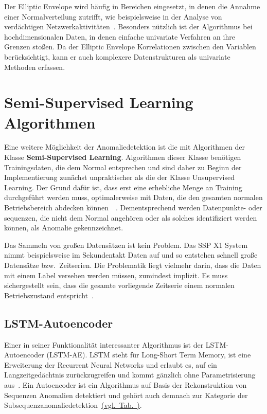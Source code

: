 Der Elliptic Envelope wird häufig in Bereichen eingesetzt, in denen die Annahme einer Normalverteilung zutrifft, wie beispielsweise in der Analyse von
verdächtigen Netzwerkaktivitäten~\cite{Ashrafuzzaman2020}. Besonders nützlich ist der Algorithmus bei hochdimensionalen Daten, in denen
einfache univariate Verfahren an ihre Grenzen stoßen. Da der Elliptic Envelope Korrelationen zwischen den Variablen berücksichtigt, kann er auch komplexere
Datenstrukturen als univariate Methoden erfassen.

\section{Semi-Supervised Learning Algorithmen}
Eine weitere Möglichkeit der Anomaliedetektion ist die mit Algorithmen der Klasse \textbf{Semi-Supervised Learning}. Algorithmen dieser Klasse benötigen
Trainingsdaten, die dem Normal entsprechen und sind daher zu Beginn der Implementierung zunächst unpraktischer als die der Klasse Unsupervised Learning.
Der Grund dafür ist, dass erst eine erhebliche Menge an Training durchgeführt werden muss, optimalerweise mit Daten, die den gesamten normalen Betriebsbereich
abdecken können~\cite[S.~2-4]{Chapelle2010}~\cite{Schmidl2022}. Dementsprechend werden Datenpunkte- oder sequenzen, die nicht dem Normal angehören oder
als solches identifiziert werden können, als Anomalie gekennzeichnet.

Das Sammeln von großen Datensätzen ist kein Problem. Das SSP X1 System nimmt beispielsweise im Sekundentakt Daten auf und so entstehen schnell große
Datensätze bzw.~Zeitserien. Die Problematik liegt vielmehr darin, dass die Daten mit einem Label versehen werden müssen, zumindest implizit. Es muss
sichergestellt sein, dass die gesamte vorliegende Zeitserie einem normalen Betriebszustand entspricht~\cite[S.~10~ff]{Chapelle2010}.

\subsection{LSTM-Autoencoder}
Einer in seiner Funktionalität interessanter Algorithmus ist der LSTM-Autoencoder (LSTM-AE). LSTM steht für Long-Short Term Memory, ist eine Erweiterung der
Recurrent Neural Networks und erlaubt es, auf ein Langzeitgedächtnis zurückzugreifen und kommt gänzlich ohne Parametrisierung aus~\cite{Hochreiter1997}.
Ein Autoencoder ist ein Algorithmus auf Basis der Rekonstruktion von Sequenzen Anomalien detektiert und gehört auch demnach zur Kategorie der
Subsequenzanomaliedetektion~\hyperref[tab:algorithmen]{(vgl.~Tab.~)}.

